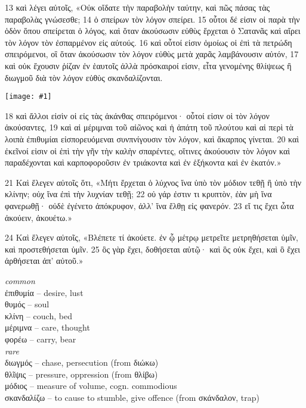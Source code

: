 \documentclass[10pt,a5paper,twoside,twocolumn]{book}
\newcommand{\fig}[1]{\texttt{[image: \#1]}\label{fig:#1}}
\newcommand*\cleartoleftpage{%
  \ifodd\value{page}\hbox{}\clearpage\fi
}
\newcommand{\sceneseparator}{%
  \vspace{-0.7\baselineskip}%
  \hspace{-0.01\textwidth}\noindent\makebox[\linewidth]{\resizebox{0.15\linewidth}{1pt}{$\bullet$}}%
  \vspace{-0.2\baselineskip}
}
\newenvironment{facing}{\cleartoleftpage}{\clearpage\pagebreak}
\newenvironment{help}{\clearpage}{}
\newenvironment{helpsec}{\begin{minipage}[t]{\textwidth}\begin{multicols}{2}}{\end{multicols}\end{minipage}}
\newenvironment{vocab}{\begin{helpsec}}{\end{helpsec}}
\begin{document}
\begin{facing}

13 καὶ λέγει αὐτοῖς, «Οὐκ οἴδατε τὴν παραβολὴν ταύτην, καὶ πῶς πάσας τὰς παραβολὰς γνώσεσθε; 14 ὁ σπείρων τὸν λόγον σπείρει. 15 οὗτοι δέ εἰσιν οἱ παρὰ τὴν ὁδὸν ὅπου σπείρεται ὁ λόγος, καὶ ὅταν ἀκούσωσιν εὐθὺς ἔρχεται ὁ Σατανᾶς καὶ αἴρει τὸν λόγον τὸν ἐσπαρμένον εἰς αὐτούς. 16 καὶ οὗτοί εἰσιν ὁμοίως οἱ ἐπὶ τὰ πετρώδη σπειρόμενοι, οἳ ὅταν ἀκούσωσιν τὸν λόγον εὐθὺς μετὰ χαρᾶς λαμβάνουσιν αὐτόν, 17 καὶ οὐκ ἔχουσιν ῥίζαν ἐν ἑαυτοῖς ἀλλὰ πρόσκαιροί εἰσιν, εἶτα γενομένης θλίψεως ἢ διωγμοῦ διὰ τὸν λόγον εὐθὺς σκανδαλίζονται. 

\fig{04-19} %

18 καὶ ἄλλοι εἰσὶν οἱ εἰς τὰς ἀκάνθας σπειρόμενοι· οὗτοί εἰσιν οἱ τὸν λόγον ἀκούσαντες, 19 καὶ αἱ μέριμναι τοῦ αἰῶνος καὶ ἡ ἀπάτη τοῦ πλούτου καὶ αἱ περὶ τὰ λοιπὰ ἐπιθυμίαι εἰσπορευόμεναι συνπνίγουσιν τὸν λόγον, καὶ ἄκαρπος γίνεται. 20 καὶ ἐκεῖνοί εἰσιν οἱ ἐπὶ τὴν γῆν τὴν καλὴν σπαρέντες, οἵτινες ἀκούουσιν τὸν λόγον καὶ παραδέχονται καὶ καρποφοροῦσιν ἐν τριάκοντα καὶ ἐν ἑξήκοντα καὶ ἐν ἑκατόν.»

\vfill\sceneseparator\vfill

21 Καὶ ἔλεγεν αὐτοῖς ὅτι, «Μήτι ἔρχεται ὁ λύχνος ἵνα ὑπὸ τὸν μόδιον τεθῇ ἢ ὑπὸ τὴν κλίνην; οὐχ ἵνα ἐπὶ τὴν λυχνίαν τεθῇ; 22 οὐ γάρ ἐστιν τι κρυπτὸν, ἐὰν μὴ ἵνα φανερωθῇ· οὐδὲ ἐγένετο ἀπόκρυφον, ἀλλ’ ἵνα ἔλθῃ εἰς φανερόν. 23 εἴ τις ἔχει ὦτα ἀκούειν, ἀκουέτω.»

\vfill\sceneseparator\vfill

24 Καὶ ἔλεγεν αὐτοῖς, «Βλέπετε τί ἀκούετε. ἐν ᾧ μέτρῳ μετρεῖτε μετρηθήσεται ὑμῖν, καὶ προστεθήσεται ὑμῖν. 25 ὃς γὰρ ἔχει, δοθήσεται αὐτῷ· καὶ ὃς οὐκ ἔχει, καὶ ὃ ἔχει ἀρθήσεται ἀπ’ αὐτοῦ.»


\begin{help}
\begin{vocab}
\emph{common}\\
ἐπιθυμία -- desire, lust\\
θυμός -- soul\\
κλίνη -- couch, bed\\
μέριμνα -- care, thought\\
φορέω -- carry, bear\\

\emph{rare}\\
διωγμός -- chase, persecution (from διώκω)\\
θλῖψις -- pressure, oppression (from θλίβω)\\
μόδιος -- measure of volume, cogn. commodious\\
σκανδαλίζω -- to cause to stumble, give offence (from σκάνδαλον, trap)\\


\end{vocab}
\end{help}
\end{facing}
\end{document}
